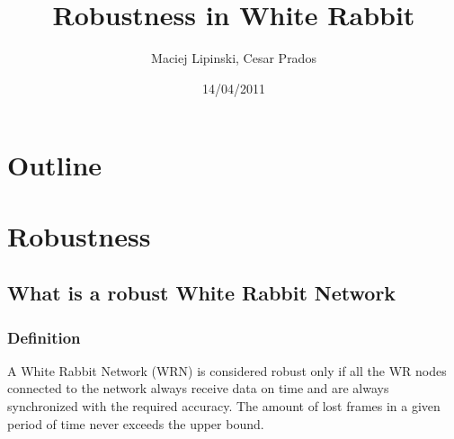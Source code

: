 \documentclass[]{beamer}
\title{Robustness in White Rabbit}    %
\author{Maciej Lipinski, Cesar Prados} %
\institute{CERN \&  GSI}      %
\date{14/04/2011}             %
\begin{document}
\begin{frame}
  \titlepage{}
\end{frame}

\section*{Outline}
\begin{frame}
  \tableofcontents
\end{frame}
\section{Robustness}
\subsection{What is a robust White Rabbit Network}
\begin{frame}
  \frametitle{Definition}
\centering

A White Rabbit Network (WRN) is considered robust only if all the WR nodes
connected to the network always receive data on time and are always
synchronized with the required accuracy. The amount of lost frames in a given 
period of time never exceeds the upper bound.

\end{frame}

\end{document}
